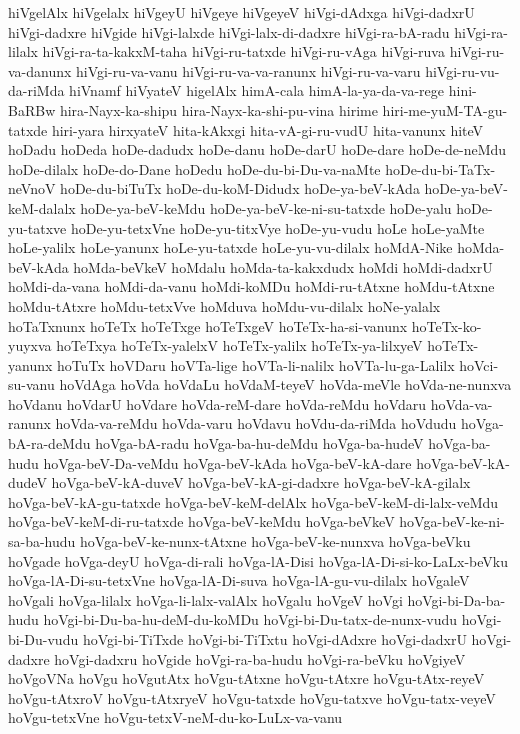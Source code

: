 {hiVgelAlx
hiVgelalx
hiVgeyU
hiVgeye
hiVgeyeV
hiVgi-dAdxga
hiVgi-dadxrU
hiVgi-dadxre
hiVgide
hiVgi-lalxde
hiVgi-lalx-di-dadxre
hiVgi-ra-bA-radu
hiVgi-ra-lilalx
hiVgi-ra-ta-kakxM-taha
hiVgi-ru-tatxde
hiVgi-ru-vAga
hiVgi-ruva
hiVgi-ru-va-danunx
hiVgi-ru-va-vanu
hiVgi-ru-va-va-ranunx
hiVgi-ru-va-varu
hiVgi-ru-vu-da-riMda
hiVnamf
hiVyateV
higelAlx
himA-cala
himA-la-ya-da-va-rege
hini-BaRBw
hira-Nayx-ka-shipu
hira-Nayx-ka-shi-pu-vina
hirime
hiri-me-yuM-TA-gu-tatxde
hiri-yara
hirxyateV
hita-kAkxgi
hita-vA-gi-ru-vudU
hita-vanunx
hiteV
hoDadu
hoDeda
hoDe-dadudx
hoDe-danu
hoDe-darU
hoDe-dare
hoDe-de-neMdu
hoDe-dilalx
hoDe-do-Dane
hoDedu
hoDe-du-bi-Du-va-naMte
hoDe-du-bi-TaTx-neVnoV
hoDe-du-biTuTx
hoDe-du-koM-Didudx
hoDe-ya-beV-kAda
hoDe-ya-beV-keM-dalalx
hoDe-ya-beV-keMdu
hoDe-ya-beV-ke-ni-su-tatxde
hoDe-yalu
hoDe-yu-tatxve
hoDe-yu-tetxVne
hoDe-yu-titxVye
hoDe-yu-vudu
hoLe
hoLe-yaMte
hoLe-yalilx
hoLe-yanunx
hoLe-yu-tatxde
hoLe-yu-vu-dilalx
hoMdA-Nike
hoMda-beV-kAda
hoMda-beVkeV
hoMdalu
hoMda-ta-kakxdudx
hoMdi
hoMdi-dadxrU
hoMdi-da-vana
hoMdi-da-vanu
hoMdi-koMDu
hoMdi-ru-tAtxne
hoMdu-tAtxne
hoMdu-tAtxre
hoMdu-tetxVve
hoMduva
hoMdu-vu-dilalx
hoNe-yalalx
hoTaTxnunx
hoTeTx
hoTeTxge
hoTeTxgeV
hoTeTx-ha-si-vanunx
hoTeTx-ko-yuyxva
hoTeTxya
hoTeTx-yalelxV
hoTeTx-yalilx
hoTeTx-ya-lilxyeV
hoTeTx-yanunx
hoTuTx
hoVDaru
hoVTa-lige
hoVTa-li-nalilx
hoVTa-lu-ga-Lalilx
hoVci-su-vanu
hoVdAga
hoVda
hoVdaLu
hoVdaM-teyeV
hoVda-meVle
hoVda-ne-nunxva
hoVdanu
hoVdarU
hoVdare
hoVda-reM-dare
hoVda-reMdu
hoVdaru
hoVda-va-ranunx
hoVda-va-reMdu
hoVda-varu
hoVdavu
hoVdu-da-riMda
hoVdudu
hoVga-bA-ra-deMdu
hoVga-bA-radu
hoVga-ba-hu-deMdu
hoVga-ba-hudeV
hoVga-ba-hudu
hoVga-beV-Da-veMdu
hoVga-beV-kAda
hoVga-beV-kA-dare
hoVga-beV-kA-dudeV
hoVga-beV-kA-duveV
hoVga-beV-kA-gi-dadxre
hoVga-beV-kA-gilalx
hoVga-beV-kA-gu-tatxde
hoVga-beV-keM-delAlx
hoVga-beV-keM-di-lalx-veMdu
hoVga-beV-keM-di-ru-tatxde
hoVga-beV-keMdu
hoVga-beVkeV
hoVga-beV-ke-ni-sa-ba-hudu
hoVga-beV-ke-nunx-tAtxne
hoVga-beV-ke-nunxva
hoVga-beVku
hoVgade
hoVga-deyU
hoVga-di-rali
hoVga-lA-Disi
hoVga-lA-Di-si-ko-LaLx-beVku
hoVga-lA-Di-su-tetxVne
hoVga-lA-Di-suva
hoVga-lA-gu-vu-dilalx
hoVgaleV
hoVgali
hoVga-lilalx
hoVga-li-lalx-valAlx
hoVgalu
hoVgeV
hoVgi
hoVgi-bi-Da-ba-hudu
hoVgi-bi-Du-ba-hu-deM-du-koMDu
hoVgi-bi-Du-tatx-de-nunx-vudu
hoVgi-bi-Du-vudu
hoVgi-bi-TiTxde
hoVgi-bi-TiTxtu
hoVgi-dAdxre
hoVgi-dadxrU
hoVgi-dadxre
hoVgi-dadxru
hoVgide
hoVgi-ra-ba-hudu
hoVgi-ra-beVku
hoVgiyeV
hoVgoVNa
hoVgu
hoVgutAtx
hoVgu-tAtxne
hoVgu-tAtxre
hoVgu-tAtx-reyeV
hoVgu-tAtxroV
hoVgu-tAtxryeV
hoVgu-tatxde
hoVgu-tatxve
hoVgu-tatx-veyeV
hoVgu-tetxVne
hoVgu-tetxV-neM-du-ko-LuLx-va-vanu
}
